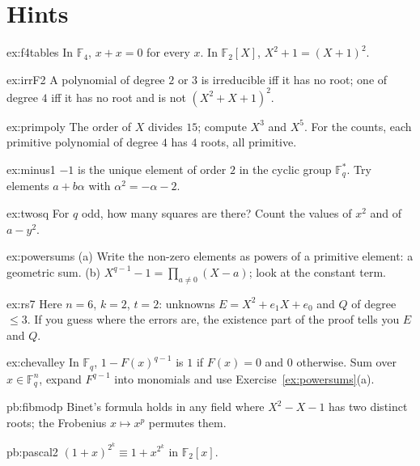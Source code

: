 \section{Hints}

\begin{hint}{ex:f4tables}
In $\mathbb F_4$, $x+x=0$ for every $x$. In $\mathbb F_2[X]$, $X^2+1=(X+1)^2$.
\end{hint}
\begin{hint}{ex:irrF2}
A polynomial of degree $2$ or $3$ is irreducible iff it has no root; one of degree $4$ iff it has no root and is not $(X^2+X+1)^2$.
\end{hint}
\begin{hint}{ex:primpoly}
The order of $X$ divides $15$; compute $X^3$ and $X^5$. For the counts, each primitive polynomial of degree $4$ has $4$ roots, all primitive.
\end{hint}
\begin{hint}{ex:minus1}
$-1$ is the unique element of order $2$ in the cyclic group $\mathbb F_q^*$. Try elements $a+b\alpha$ with $\alpha^2=-\alpha-2$.
\end{hint}
\begin{hint}{ex:twosq}
For $q$ odd, how many squares are there? Count the values of $x^2$ and of $a-y^2$.
\end{hint}
\begin{hint}{ex:powersums}
(a) Write the non-zero elements as powers of a primitive element: a geometric sum. (b) $X^{q-1}-1=\prod_{a\ne0}(X-a)$; look at the constant term.
\end{hint}
\begin{hint}{ex:rs7}
Here $n=6$, $k=2$, $t=2$: unknowns $E=X^2+e_1X+e_0$ and $Q$ of degree $\le3$. If you guess where the errors are, the existence part of the proof tells you $E$ and $Q$.
\end{hint}
\begin{hint}{ex:chevalley}
In $\mathbb F_q$, $1-F(x)^{q-1}$ is $1$ if $F(x)=0$ and $0$ otherwise. Sum over $x\in\mathbb F_q^n$, expand $F^{q-1}$ into monomials and use Exercise~\ref{ex:powersums}(a).
\end{hint}

\begin{hint}{pb:fibmodp}
Binet's formula holds in any field where $X^2-X-1$ has two distinct roots; the Frobenius $x\mapsto x^p$ permutes them.
\end{hint}

\begin{hint}{pb:pascal2}
$(1+x)^{2^k}\equiv1+x^{2^k}$ in $\mathbb F_2[x]$.
\end{hint}

